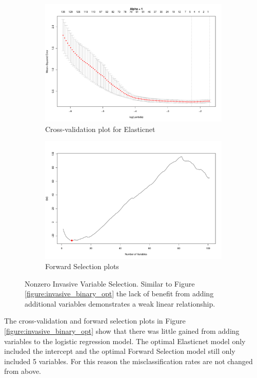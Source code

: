 \documentclass{article}
\begin{document}
\begin{figure}[h!]
\begin{subfigure}[b]{0.5\textwidth}
\includegraphics[width=\textwidth]{elastic_cv_invasive_nonzero.pdf}
\caption{Cross-validation plot for Elasticnet}
\end{subfigure}
\hfill
\begin{subfigure}[b]{0.5\textwidth}
\includegraphics[width=\textwidth]{forward_nvars_invasive_nonzero.pdf}
\caption{Forward Selection plots}
\end{subfigure}
\caption{Nonzero Invasive Variable Selection. Similar to Figure \ref{figure:invasive_binary_opt} the lack of benefit from adding additional variables demonstrates a weak linear relationship.}
\label{figure:invasive_nonzero_opt}
\end{figure}

The cross-validation and forward selection plots in Figure \ref{figure:invasive_binary_opt} show that there was little gained from 
adding variables to the logistic regression model. The optimal Elasticnet model only included the intercept and the optimal 
Forward Selection model still only included 5 variables. For this reason the misclassification rates are not changed from above. 
\end{document}
